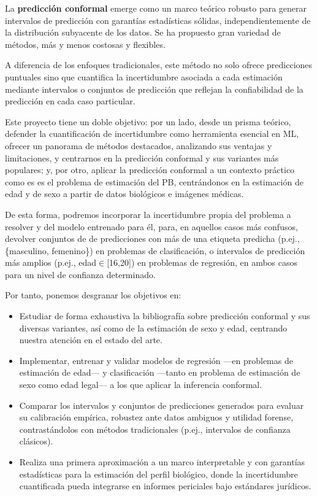 La \textbf{predicción conformal} emerge como un marco teórico robusto para 
generar intervalos de predicción con garantías estadísticas sólidas, independientemente de la distribución 
subyacente de los datos. Se ha propuesto gran variedad de métodos, más y menos costosas y flexibles.

A diferencia de los enfoques tradicionales, este método no solo ofrece predicciones puntuales sino que 
cuantifica la incertidumbre asociada a cada estimación mediante intervalos o conjuntos de 
predicción que reflejan la confiabilidad de la predicción en cada caso particular.

Este proyecto tiene un doble objetivo: por un lado, desde un prisma teórico, defender la cuantificación de
incertidumbre como herramienta esencial en ML, ofrecer un panorama de métodos destacados, analizando sus
ventajas y limitaciones, y centrarnos en la predicción conformal y sus variantes más populares; y, 
por otro, aplicar la predicción conformal a un contexto práctico como es es el problema de estimación del PB, 
centrándonos en la estimación de edad y de sexo a partir de datos biológicos e imágenes médicas. 

De esta forma, podremos incorporar la incertidumbre propia del problema a resolver y del modelo entrenado para 
él, para, en aquellos casos más confusos, devolver conjuntos de de predicciones con más de una etiqueta 
predicha (p.ej., \{masculino, femenino\}) en problemas de clasificación, o intervalos de predicción más 
amplios (p.ej., edad$\in$[16,20]) en problemas de regresión, en ambos casos para un nivel de confianza 
determinado.

Por tanto, ponemos desgranar los objetivos en:

\begin{itemize}

    \item Estudiar de forma exhaustiva la bibliografía sobre predicción conformal y sus diversas 
    variantes, así como de la estimación de sexo y edad, centrando nuestra atención en el estado del arte.

    \item Implementar, entrenar y validar modelos de regresión ---en problemas de estimación de edad--- y 
    clasificación ---tanto en problema de estimación de sexo como edad legal--- a los que aplicar la 
    inferencia conformal.

    \item Comparar los intervalos y conjuntos de predicciones generados para evaluar su calibración empírica, 
    robustez ante datos ambiguos y utilidad forense, contrastándolos con métodos tradicionales (p.ej., 
    intervalos de confianza clásicos).  

    \item Realiza una primera aproximación a un marco interpretable y con garantías estadísticas para la 
    estimación del perfil biológico, donde la incertidumbre cuantificada pueda integrarse en informes 
    periciales bajo estándares jurídicos.

\end{itemize}

